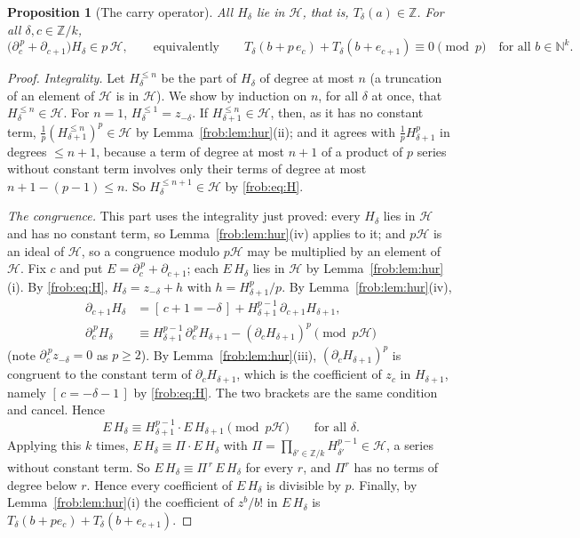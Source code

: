 \documentclass[11pt]{article}
\newtheorem{proposition}[theorem]{Proposition}
\theoremstyle{definition}
\theoremstyle{remark}
\numberwithin{equation}{section}
\numberwithin{figure}{section}
\newcommand{\Z}{\mathbb Z}
\newcommand{\N}{\mathbb N}
\newcommand{\Hur}{\mathcal H}
\newcommand{\br}[1]{[\,#1\,]}
\begin{document}
\begin{proposition}[The carry operator]\label{frob:prop:carry}
All $H_\delta$ lie in $\Hur$, that is, $T_\delta(a)\in\Z$. For all $\delta,c\in\Z/k$,
\[
 \bigl(\partial_c^{\,p}+\partial_{c+1}\bigr)H_\delta\in p\,\Hur ,
 \qquad\text{equivalently}\qquad
 T_\delta(b+p\,e_c)+T_\delta(b+e_{c+1})\equiv0\pmod p\quad\text{for all }b\in\N^k .
\]
\end{proposition}

\begin{proof}
\emph{Integrality.} Let $H_\delta^{\le n}$ be the part of $H_\delta$ of degree at most $n$
(a truncation of an element of $\Hur$ is in $\Hur$). We show by induction on $n$, for all
$\delta$ at once, that $H_\delta^{\le n}\in\Hur$. For $n=1$, $H_\delta^{\le1}=z_{-\delta}$.
If $H_{\delta+1}^{\le n}\in\Hur$, then, as it has no constant term,
$\frac1p(H_{\delta+1}^{\le n})^p\in\Hur$ by Lemma~\ref{frob:lem:hur}(ii); and it agrees with
$\frac1pH_{\delta+1}^p$ in degrees $\le n+1$, because a term of degree at most $n+1$ of a
product of $p$ series without constant term involves only their terms of degree at most
$n+1-(p-1)\le n$. So $H_\delta^{\le n+1}\in\Hur$ by \eqref{frob:eq:H}.

\emph{The congruence.} This part uses the integrality just proved: every $H_\delta$ lies in
$\Hur$ and has no constant term, so Lemma~\ref{frob:lem:hur}(iv) applies to it; and $p\Hur$ is an
ideal of $\Hur$, so a congruence modulo $p\Hur$ may be multiplied by an element of $\Hur$.
Fix $c$ and put $E=\partial_c^{\,p}+\partial_{c+1}$; each $E\,H_\delta$ lies in $\Hur$ by
Lemma~\ref{frob:lem:hur}(i). By \eqref{frob:eq:H},
$H_\delta=z_{-\delta}+h$ with $h=H_{\delta+1}^p/p$. By Lemma~\ref{frob:lem:hur}(iv),
\begin{align*}
 \partial_{c+1}H_\delta&=\br{c+1=-\delta}+H_{\delta+1}^{p-1}\,\partial_{c+1}H_{\delta+1},\\
 \partial_c^{\,p}H_\delta&\equiv H_{\delta+1}^{p-1}\,\partial_c^{\,p}H_{\delta+1}
   -(\partial_cH_{\delta+1})^p\pmod{p\Hur}
\end{align*}
(note $\partial_c^{\,p}z_{-\delta}=0$ as $p\ge2$). By Lemma~\ref{frob:lem:hur}(iii),
$(\partial_cH_{\delta+1})^p$ is congruent to the constant term of $\partial_cH_{\delta+1}$,
which is the coefficient of $z_c$ in $H_{\delta+1}$, namely $\br{c=-\delta-1}$ by
\eqref{frob:eq:H}. The two brackets are the same condition and cancel. Hence
\[
 E\,H_\delta\equiv H_{\delta+1}^{p-1}\cdot E\,H_{\delta+1}\pmod{p\Hur}\qquad
 \text{for all }\delta .
\]
Applying this $k$ times, $E\,H_\delta\equiv\Pi\cdot E\,H_\delta$ with
$\Pi=\prod_{\delta'\in\Z/k}H_{\delta'}^{p-1}\in\Hur$, a series without constant term. So
$E\,H_\delta\equiv\Pi^{\,r}\,E\,H_\delta$ for every $r$, and $\Pi^r$ has no terms of degree
below $r$. Hence every coefficient of $E\,H_\delta$ is divisible by $p$. Finally, by
Lemma~\ref{frob:lem:hur}(i) the coefficient of $z^b/b!$ in $E\,H_\delta$ is
$T_\delta(b+pe_c)+T_\delta(b+e_{c+1})$.
\end{proof}
\end{document}
